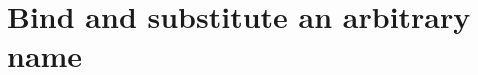 \documentclass[9pt,preprint,authoryear]{sigplanconf}
\begin{document}
\section{Bind and substitute an arbitrary name}

%
{\noindent}%
%
%
%
%
%
\end{document}
